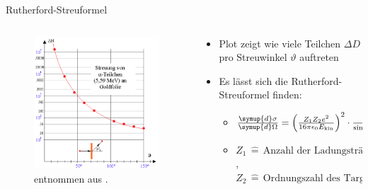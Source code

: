 \documentclass[aspectratio=1610, 9pt]{beamer}
\begin{document}
\begin{frame}{Rutherford-Streuformel}
  \begin{columns}
    \begin{column}{0.4\textwidth}
      \begin{figure}
        \includegraphics[width=\textwidth]{images/Streuung.png}
        \caption{entnommen aus \cite{leifi}.}        
      \end{figure}

    \end{column}
    \begin{column}{0.6\textwidth}
      \begin{itemize}
        \item{Plot zeigt wie viele Teilchen $\Delta D$ pro Streuwinkel $\vartheta$ auftreten}
        \item{Es lässt sich die Rutherford-Streuformel finden:}
        \begin{itemize}
        \item{$ \frac{\symup{d} \sigma}{\symup{d} \Omega } = \left( \frac{Z_\text{1}Z_\text{2} e^2}{16 \pi \epsilon_\text{0} E_\text{kin}} \right)^2 \cdot \frac{1}{\sin^4{\frac{\vartheta}{2}}} $}
        \item{$Z_\text{1} \,\hat{=}  \,\text{Anzahl der Ladungsträgern des gestreuten Teilchen} $, $Z_\text{2} \,\hat{=}  \,\text{Ordnungszahl des Targets} $}
        \end{itemize}
      \end{itemize}
    \end{column}
  \end{columns}
\end{frame}
\end{document}
